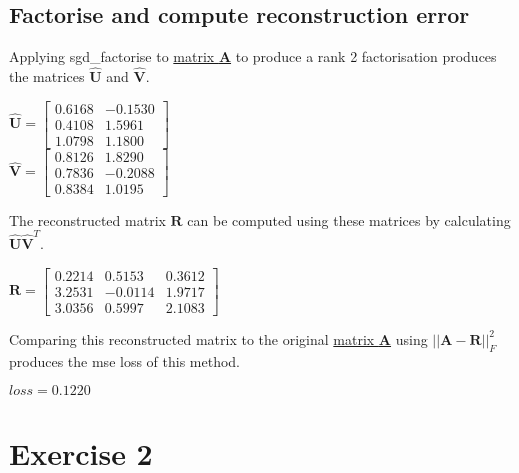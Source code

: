 \documentclass[sigconf]{acmart}
\begin{document}
\subsection{Factorise and compute reconstruction error} 
\label{sec:fac}
Applying sgd\_factorise to \hyperlink{mat:A}{matrix \textbf{A}} to produce a rank 2 factorisation produces the matrices $\mathbf{\hat{U}}$ and $\mathbf{\hat{V}}$.
\begin{center}
    $ \mathbf{\hat{U}} = 
    \begin{bmatrix}
            0.6168 & -0.1530 \\
            0.4108 &  1.5961 \\
            1.0798 &  1.1800
    \end{bmatrix} $ \\
    $ \mathbf{\hat{V}} = 
    \begin{bmatrix}
        0.8126 &  1.8290 \\
        0.7836 & -0.2088 \\
        0.8384 &  1.0195
    \end{bmatrix} $
\end{center}
The reconstructed matrix $\mathbf{R}$ can be computed using these matrices by calculating $\mathbf{\hat{U}\hat{V}}^{T}$. 
\begin{center}
    \begin{math}
        \mathbf{R} = \begin{bmatrix}
            0.2214 &  0.5153 &  0.3612 \\
            3.2531 & -0.0114 &  1.9717 \\
            3.0356 &  0.5997 &  2.1083 
        \end{bmatrix} 
    \end{math}
\end{center} 
Comparing this reconstructed matrix to the original \hyperlink{mat:A}{matrix \textbf{A}} using $|| \mathbf{A} - \mathbf{R}||^{2}_{F} $ produces the mse loss of this method.
\begin{center}
    \begin{math}
        loss = 0.1220
    \end{math}
\end{center}
\section{Exercise 2}
\end{document}
